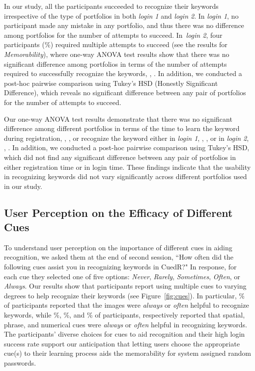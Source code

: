 In our study, all the participants succeeded to recognize their keywords irrespective of the type of portfolios in both \textit{login 1} and \textit{login 2}. In \textit{login 1}, no participant made any mistake in any portfolio, and thus there was no difference among portfolios for the number of attempts to succeed. In~\textit{login 2}, four participants (\%) required multiple attempts to succeed (see the results for \textit{Memorability}), where one-way ANOVA test results show that there was no significant difference among portfolios in terms of the number of attempts required to successfully recognize the keywords, , . In addition, we conducted a post-hoc pairwise comparison using Tukey's HSD (Honestly Significant Difference), which reveals no significant difference between any pair of portfolios for the number of attempts to succeed. 

Our one-way ANOVA test results demonstrate that there was no significant difference among different portfolios in terms of the time to learn the keyword during registration, , , or recognize the keyword either in \textit{login 1}, , , or in \textit{login 2}, , . In addition, we conducted a post-hoc pairwise comparison using Tukey's HSD, which did not find any significant difference between any pair of portfolios in either registration time or in login time. These findings indicate that the usability in recognizing keywords did not vary significantly across different portfolios used in our study.

\subsection{User Perception on the Efficacy of Different Cues}\label{effect_cues} 

To understand user perception on the importance of different cues in aiding recognition, we asked them at the end of second session, ``How often did the following cues assist you in recognizing keywords in CuedR?" In response, for each cue they selected one of five options: \textit{Never}, \textit{Rarely}, \textit{Sometimes}, \textit{Often}, or \textit{Always}. Our results show that participants report using multiple cues to varying degrees to help recognize their keywords (see Figure~\ref{fig:cues}). In particular, \% of participants reported that the images were \textit{always} or \textit{often} helpful to recognize keywords, while \%, \%, and \% of participants, respectively reported that spatial, phrase, and numerical cues were \textit{always} or \textit{often} helpful in recognizing keywords. The participants' diverse choices for cues to aid recognition and their high login success rate support our anticipation that letting users choose the appropriate cue(s) to their learning process aids the memorability for system assigned random passwords. 

